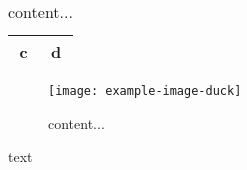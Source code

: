 \documentclass{beamer}
\begin{document}
    
\begin{frame}
\begin{table}
\caption{content...}
\begin{tabular}{cc}
\hline
c & d\\
\hline
\end{tabular}
\end{table}
\end{frame} 

\begin{frame}
\begin{figure}
\texttt{[image: example-image-duck]}
\caption{content...}
\end{figure}
text
\end{frame} 
    
\end{document}
